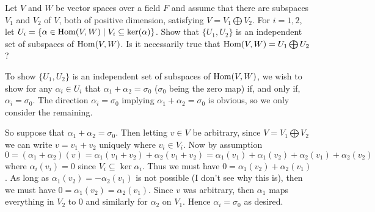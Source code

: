 \begin{ex}[Golan 253]
Let $V$ and $W$ be vector spaces over a field $F$ and assume that there are
subspaces $V_1$ and $V_2$ of $V$, both of positive dimension, satisfying
$V = V_1 \bigoplus V_2$.  For  $i=1, 2$, let 
$U_i = \{\alpha \in \operatorname{Hom}(V,W) \mid V_i \subseteq \operatorname{ker}(\alpha)\}$.
Show that $\{U_1, U_2\}$ is an independent set of subspaces of $\operatorname{Hom}(V,W)$.
Is it necessarily true that $\operatorname{Hom}(V,W) = U_1 \bigoplus U_2$?
\end{ex}
 \smallskip
 \begin{solution}
 To show $\{U_1, U_2\}$ is an independent set of subspaces of $\operatorname{Hom}(V,W)$, we wish to show for any $\alpha _i \in U_i$ that $\alpha_1 + \alpha _2 = \sigma _0$ ($\sigma _0$ being the zero map) if, and only if, $\alpha _i = \sigma _0$. The direction $\alpha _i = \sigma _0$ implying $\alpha_1 + \alpha _2 = \sigma _0$ is obvious, so we only consider the remaining.

 So suppose that $\alpha_1 + \alpha _2 = \sigma _0$. Then letting $v \in V$ be arbitrary, since $V = V_1 \bigoplus V_2$ we can write $v = v_1 + v_2$ uniquely where $v_i\in V_i$. Now by assumption
 $$
0 = (\alpha_1 + \alpha _2)(v) = \alpha_1(v_1+v_2) + \alpha _2(v_1+v_2) = \alpha _1(v_1) + \alpha_1(v_2) + \alpha _2(v_1) + \alpha_2(v_2)
 $$
 where $\alpha _i(v_i) = 0$ since $V_i \subseteq \ker{\alpha_i}$. Thus we must have $0 = \alpha_1(v_2) + \alpha _2(v_1)$. As long as $\alpha_1(v_2) = -\alpha _2(v_1)$ is not possible (I don't see why this is), then we must have
 $0 = \alpha _1 (v_2) = \alpha _2 (v_1)$. Since $v$ was arbitrary, then $\alpha _1$ maps everything in $V_2$ to 0 and similarly for $\alpha _2$ on $V_1$. Hence $\alpha _i = \sigma _0$ as desired.
 \end{solution}

\probskip

